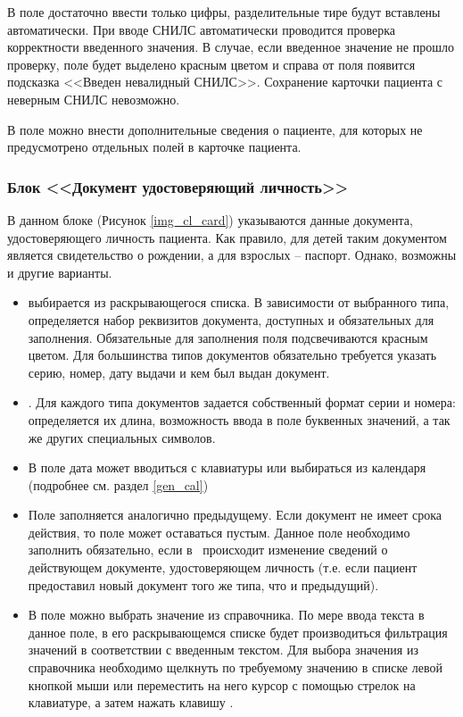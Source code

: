 {В поле  достаточно ввести только цифры, разделительные тире будут вставлены автоматически. При вводе СНИЛС автоматически проводится проверка корректности введенного значения. В случае, если введенное значение не прошло проверку, поле будет выделено красным цветом и справа от поля появится подсказка <<Введен невалидный СНИЛС>>. Сохранение карточки пациента с неверным СНИЛС невозможно.

В поле  можно внести дополнительные сведения о пациенте, для которых не предусмотрено отдельных полей в карточке пациента. 
 
\subsubsection{Блок <<Документ удостоверяющий личность>>}

В данном блоке (Рисунок \ref{img_cl_card}) указываются данные документа, удостоверяющего личность пациента. Как правило, для детей таким документом является свидетельство о рождении, а для взрослых – паспорт. Однако, возможны и другие варианты. 
\begin{itemize}
 \item {} выбирается из раскрывающегося списка. В зависимости от выбранного типа, определяется набор реквизитов документа, доступных и обязательных для  заполнения. Обязательные для заполнения поля подсвечиваются красным цветом. Для большинства типов документов обязательно требуется указать серию, номер, дату выдачи и кем был выдан документ. 
 \item {}. Для каждого типа документов задается собственный формат серии и номера: определяется их длина,  возможность ввода в поле буквенных значений, а так же других специальных символов. 
 \item В поле  дата может вводиться с клавиатуры или выбираться из календаря (подробнее см. раздел \ref{gen_cal}) 
 \item Поле  заполняется аналогично предыдущему. Если документ не имеет срока действия, то поле может оставаться пустым. Данное поле необходимо заполнить обязательно, если в \tmisp~происходит изменение сведений о действующем документе, удостоверяющем личность (т.е. если пациент предоставил новый документ того же типа, что и предыдущий). 
 \item В поле  можно выбрать значение из справочника. %
 По мере ввода текста в данное поле, в его  раскрывающемся списке будет производиться фильтрация значений в соответствии с введенным текстом. Для выбора значения из справочника необходимо щелкнуть по требуемому значению в списке левой кнопкой мыши или переместить на него курсор с помощью стрелок на клавиатуре, а затем нажать клавишу . %
\end{itemize}

}
